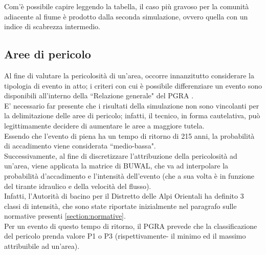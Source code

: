 Com'è possibile capire leggendo la tabella, il caso più gravoso per la comunità adiacente al fiume è prodotto dalla seconda simulazione, ovvero quella con un indice di scabrezza intermedio.

\subsection{Aree di pericolo}
Al fine di valutare la pericolosità di un'area, occorre innanzitutto considerare la tipologia di evento in atto; i criteri con cui è possibile differenziare un evento sono disponibili all'interno della ``Relazione generale" del PGRA \cite{rel_gen_pgra}.\\
E' necessario far presente che i risultati della simulazione non sono vincolanti per la delimitazione delle aree di pericolo; infatti, il tecnico, in forma cautelativa, può legittimamente decidere di aumentare le aree a maggiore tutela.\\
Essendo che l'evento di piena ha un tempo di ritorno di 215 anni, la probabilità di accadimento viene considerata ``medio-bassa".\\
Successivamente, al fine di discretizzare l'attribuzione della pericolosità ad un'area, viene applicata la matrice di BUWAL, che va ad interpolare la probabilità d'accadimento e l'intensità dell'evento (che a sua volta è in funzione del tirante idraulico e della velocità del flusso).\\
Infatti, l'Autorità di bacino per il Distretto delle Alpi Orientali ha definito 3 classi di intensità, che sono state riportate inizialmente nel paragrafo sulle normative presenti \eqref{section:normative}.\\
Per un evento di questo tempo di ritorno, il PGRA prevede che la classificazione del pericolo prenda valore P1 o P3 (rispettivamente- il minimo ed il massimo attribuibile ad un'area).\\

